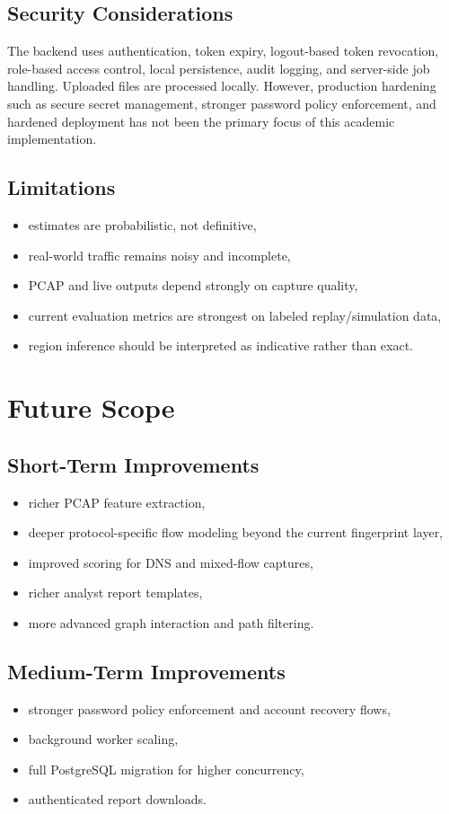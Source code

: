 \documentclass[12pt,a4paper]{report}
\begin{document}
\section{Security Considerations}
The backend uses authentication, token expiry, logout-based token revocation, role-based access control, local persistence, audit logging, and server-side job handling. Uploaded files are processed locally. However, production hardening such as secure secret management, stronger password policy enforcement, and hardened deployment has not been the primary focus of this academic implementation.

\section{Limitations}
\begin{itemize}[leftmargin=1.5em]
    \item estimates are probabilistic, not definitive,
    \item real-world traffic remains noisy and incomplete,
    \item PCAP and live outputs depend strongly on capture quality,
    \item current evaluation metrics are strongest on labeled replay/simulation data,
    \item region inference should be interpreted as indicative rather than exact.
\end{itemize}

\chapter{Future Scope}
\section{Short-Term Improvements}
\begin{itemize}[leftmargin=1.5em]
    \item richer PCAP feature extraction,
    \item deeper protocol-specific flow modeling beyond the current fingerprint layer,
    \item improved scoring for DNS and mixed-flow captures,
    \item richer analyst report templates,
    \item more advanced graph interaction and path filtering.
\end{itemize}

\section{Medium-Term Improvements}
\begin{itemize}[leftmargin=1.5em]
    \item stronger password policy enforcement and account recovery flows,
    \item background worker scaling,
    \item full PostgreSQL migration for higher concurrency,
    \item authenticated report downloads.
\end{itemize}
\end{document}
